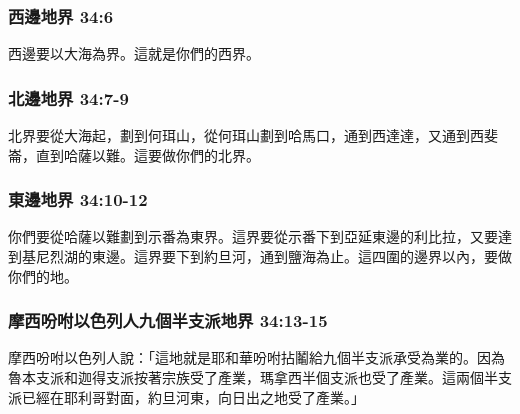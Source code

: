 \subsubsection{西邊地界 34:6}
西邊要以大海為界。這就是你們的西界。

\subsubsection{北邊地界  34:7-9}
北界要從大海起，劃到何珥山，從何珥山劃到哈馬口，通到西達達，又通到西斐崙，直到哈薩以難。這要做你們的北界。

\subsubsection{東邊地界  34:10-12}
你們要從哈薩以難劃到示番為東界。這界要從示番下到亞延東邊的利比拉，又要達到基尼烈湖的東邊。這界要下到約旦河，通到鹽海為止。這四圍的邊界以內，要做你們的地。

\subsubsection{摩西吩咐以色列人九個半支派地界  34:13-15}
摩西吩咐以色列人說：「這地就是耶和華吩咐拈鬮給九個半支派承受為業的。因為魯本支派和迦得支派按著宗族受了產業，瑪拿西半個支派也受了產業。這兩個半支派已經在耶利哥對面，約旦河東，向日出之地受了產業。」

\newpage
